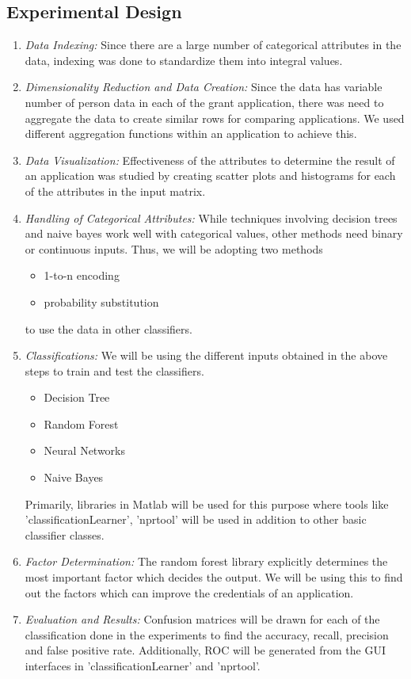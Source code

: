 \documentclass{article} %
\begin{document}
\subsection{Experimental Design}
\begin{enumerate}
	\item \emph{Data Indexing:} Since there are a large number of categorical attributes in the data, indexing was done to standardize them into integral values.
	\item \emph{Dimensionality Reduction and Data Creation:} Since the data has variable number of person data in each of the grant application, there was need to aggregate the data to create similar rows for comparing applications. We used different aggregation functions within an application\cite{OneRow} to achieve this.
	\item \emph{Data Visualization:} Effectiveness of the attributes to determine the result of an application was studied by creating scatter plots and histograms for each of the attributes in the input matrix. 
	\item \emph{Handling of Categorical Attributes:} While techniques involving decision trees and naive bayes work well with categorical values, other methods need binary or continuous inputs. Thus, we will be adopting two methods 
	\begin{itemize}
		\item 1-to-n encoding
		\item probability substitution \cite{HighCard}
	\end{itemize}  
	
	to use the data in other classifiers.

	
	\item \emph{Classifications:} We will be using the different inputs obtained in the above steps to train and test the classifiers.
	\begin{itemize}
		\item Decision Tree
		\item Random Forest
		\item Neural Networks
		\item Naive Bayes
	\end{itemize}
	 Primarily, libraries in Matlab will be used for this purpose where tools like 'classificationLearner', 'nprtool' will be used in addition to other basic classifier classes.
	 
	 \item \emph{Factor Determination:} The random forest library explicitly determines the most important factor which decides the output. We will be using this to find out the factors which can improve the credentials of an application.
	 
	 \item \emph{Evaluation and Results:} Confusion matrices will be drawn for each of the classification done in the experiments to find the accuracy, recall, precision and false positive rate. Additionally, ROC will be generated from the GUI interfaces in 'classificationLearner' and 'nprtool'.
	
	\end{enumerate}
	
\end{document}
